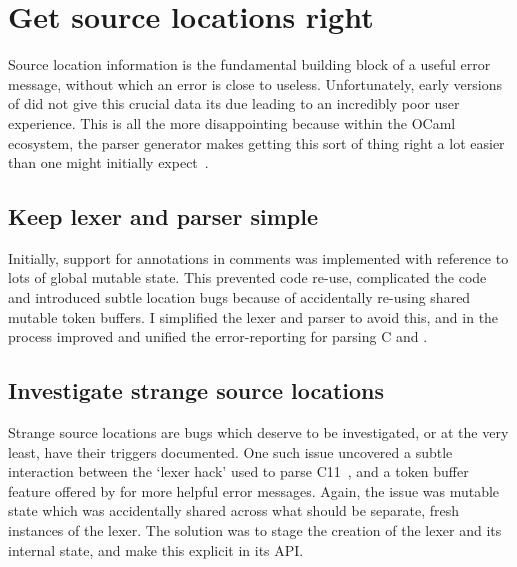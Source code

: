 \section{Get source locations right}

Source location information is the fundamental building block of a useful error
message, without which an error is close to useless. Unfortunately, early
versions of  did not give this crucial data its due leading to an
incredibly poor user experience. This is all the more disappointing because
within the OCaml ecosystem, the  parser generator makes getting this
sort of thing right a lot easier than one might initially
expect~.

\subsection{Keep lexer and parser simple}

Initially, support for 
annotations in comments was implemented with reference to lots of global
mutable state.
This prevented code re-use, complicated the code and introduced subtle
location bugs because of accidentally re-using shared mutable token
buffers. I simplified the lexer and parser to avoid this, and in the
process improved and unified the error-reporting for parsing C and
.

\subsection{Investigate strange source locations}

Strange source locations are
bugs which deserve to be investigated, or at the very least, have their
triggers documented. One such
issue uncovered a subtle interaction between the `lexer hack' used to parse
C11~, and a token buffer feature offered by
 for more helpful error messages. Again, the issue was mutable state
which was accidentally shared across what should be separate, fresh instances
of the lexer. The solution was to stage the creation of the lexer and its
internal state, and make this explicit in its
API.

